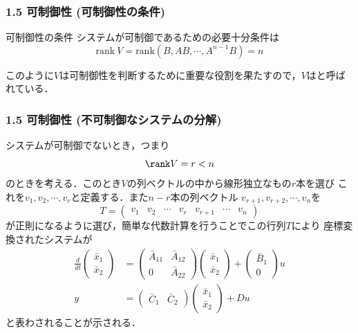 \begin{frame}[t]
\frametitle{1.5 可制御性 (可制御性の条件)}
\begin{block}{可制御性の条件}
システムが可制御であるための必要十分条件は
$$\mbox{rank}\ V = \mbox{rank} (B,AB,\cdots,A^{n-1}B) = n$$
\end{block}
このように$V$は可制御性を判断するために重要な役割を果たすので，$V$はと呼ばれている．
\end{frame}


\begin{frame}[t]
\frametitle{1.5 可制御性 (不可制御なシステムの分解)}
システムが可制御でないとき，つまり
\begin{equation}
 \rank V = r < n
\end{equation}
のときを考える．このとき$V$の列ベクトルの中から線形独立なもの$r$本を選び
これを$v_1, v_2, \cdots, v_r$と定義する．また$n-r$本の列ベクトル
$v_{r+1}, v_{r+2}, \cdots, v_n$を
\begin{equation}
 T = \left(\begin{array}{ccccccc}
            v_1 & v_2 & \cdots & v_r & v_{r+1} & \cdots & v_n
     \end{array}\right)
\end{equation}
が正則になるように選び，簡単な代数計算を行うことでこの行列$T$により
座標変換されたシステムが
\begin{align}
 \frac{d}{dt}
  \left(\begin{array}{c}
         \bar{x}_1 \\
   \bar{x}_2
  \end{array}\right)
  &=
  \left(\begin{array}{cc}
         \bar{A}_{11} & \bar{A}_{12} \\
   0            & \bar{A}_{22}
  \end{array}\right)
  \left(\begin{array}{c}
         \bar{x}_1 \\
   \bar{x}_2
  \end{array}\right)
  +
  \left(\begin{array}{c}
         \bar{B}_1 \\
   0
  \end{array}\right)
  u \\
 y &=
  \left(\begin{array}{cc}
         \bar{C}_1 & \bar{C}_2
  \end{array}\right)
  \left(\begin{array}{c}
         \bar{x}_1 \\
   \bar{x}_2
  \end{array}\right)
  + D u
\end{align}
と表わされることが示される．
\end{frame}


